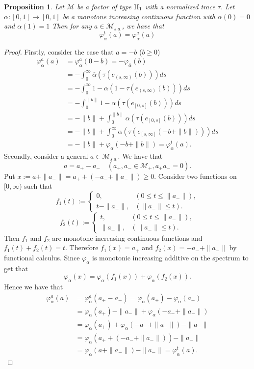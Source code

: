 \documentclass[a4paper,12pt]{amsart}
\newtheorem{proposition}[definition]{Proposition}
\newcommand{\M}{\mathcal{M}}
\begin{document}
\begin{proposition} 
\label{prop:anti-symmetric = translatable}
Let $\M$ be a factor of type ${\rm II}_1$ with a normalized trace $\tau$.  
Let $\alpha: [0,1]  \rightarrow [0, 1]$ be a 
monotone increasing continuous function with $\alpha(0) = 0$ and $\alpha(1) = 1$ 
Then for any $a \in \M_{s.a.}$, we have that 
$$
\varphi_{\alpha}^{t}(a)  = \varphi_{\alpha}^{a}(a)
$$
\end{proposition}
\begin{proof}
Firstly, consider the case that $a = -b$ ($b \geq 0$)
\begin{align*}
\varphi_{\alpha}^{a}(a) & = \varphi_{\alpha}^{a}(0 - b) = - \varphi_{\overline{\alpha}}(b)\\
& = - \int_0^{\infty}  \overline{\alpha}(\tau(e_{(s,\infty)}(b)))ds \\
& = - \int_0^{\infty} 1 - \alpha(1-\tau(e_{(s,\infty)}(b)))  ds \\
& = - \int_0^{\|b\|} 1 - \alpha(\tau(e_{[0,s]}(b)))  ds \\
& = - \|b\| + \int_0^{\|b\|} \alpha(\tau(e_{[0,s]}(b)))  ds \\
& = - \|b\| + \int_0^{\infty} \alpha(\tau(e_{[s,\infty]}(-b + \|b\|)))  ds \\
& = - \|b\| +  \varphi_{\alpha}(-b + \|b\|) = \varphi_{\alpha}^{t}(a) .
\end{align*}
Secondly, consider a general $a \in \M_{s.a.}$.  We have that 
$$
a = a_+ - a_-  \quad (a_+, a_- \in \M_+, a_+ a_- = 0).  
$$
Put $ x := a + \|a_-\|  =  a_+  + (-a_- + \|a_-\|)\geq 0.$ 
Consider two functions on $[0,\infty)$ such that   
$$
f_1(t) :=
\begin{cases}  0, & (0 \leq t \leq \|a_- \|), \\
 t -  \| a_- \|, & (\| a_- \| \leq t ). 
\end{cases}
$$
$$
f_2(t) :=
\begin{cases}  t, & (0 \leq t \leq \| a_- \|), \\
\| a_- \|, & (\| a_- \| \leq t ). 
\end{cases}
$$
Then $f_1$ and $f_2$ are monotone increasing continuous functions and $f_1(t) + f_2(t) = t$.  
Therefore $f_1(x) = a_+$ and $f_2(x) = -a_- + \|a_-\|$ by functional calculus. 
Since $\varphi_{\alpha}$ is monotonic increasing additive on the spectrum 
to get that 
$$
\varphi_{\alpha}(x) = \varphi_{\alpha}(f_1(x)) + \varphi_{\alpha}(f_2(x)).
$$
Hence we have that
\begin{align*}
\varphi_{\alpha}^{a}(a) & = \varphi_{\alpha}^{a}(a_+ - a_-) = \varphi_{\alpha}(a_+)  - \varphi_{\overline{\alpha}}(a_-)\\
& = \varphi_{\alpha}(a_+) - \|a_-\| + \varphi_{\alpha}(-a_- + \|a_-\|)\\
& = \varphi_{\alpha}(a_+)  + \varphi_{\alpha}(-a_- + \|a_-\|) - \|a_-\|\\
& = \varphi_{\alpha}(a_+  + (-a_- + \|a_-\|) ) - \|a_-\| \\
& = \varphi_{\alpha}(a + \|a_-\|) - \|a_-\|  =  \varphi_{\alpha}^{t}(a). 
\end{align*}
\end{proof}
\end{document}
